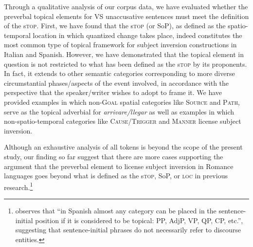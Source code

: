 \documentclass[output=paper,colorlinks,citecolor=brown,
]{langscibook}
\begin{document}
Through a qualitative analysis of our corpus data, we have evaluated whether the preverbal topical elements for VS unaccusative sentences must meet the definition of the s\textsc{top}. First, we have found that the s\textsc{top} (or SoP), as defined as the spatio-temporal location in which quantized change takes place, indeed constitutes the most common type of topical framework for subject inversion constructions in Italian and Spanish. However, we have demonstrated that the topical element in question is not restricted to what has been defined as the s\textsc{top} by its proponents. In fact, it extends to other semantic categories corresponding to more diverse circumstantial phases/aspects of the event involved, in accordance with the perspective that the speaker/writer wishes to adopt to frame it. We have provided examples in which non-\textsc{Goal} spatial categories like \textsc{Source} and \textsc{Path}, serve as the topical adverbial for \textit{arrivare/llegar} as well as examples in which non-spatio-temporal categories like \textsc{Cause/Trigger} and \textsc{Manner} license subject inversion.

Although an exhaustive analysis of all tokens is beyond the scope of the present study, our finding so far suggest that there are more cases supporting the argument that the preverbal element to license subject inversion in Romance languages goes beyond what is defined as the s\textsc{top}, SoP, or \textsc{loc} in previous research.\footnote{\citet[27]{casielles2004syntax} observes that ``in Spanish almost any category can be placed in the sentence-initial position if it is considered to be topical: PP, AdjP, VP, QP, CP, etc.'', suggesting that sentence-initial phrases do not necessarily refer to discourse entities. }
\end{document}
